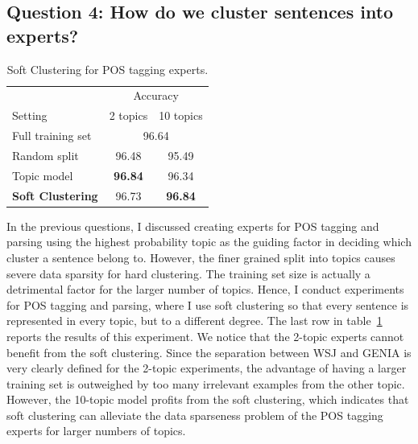 \subsection*{Question 4: How do we cluster sentences into experts? }

\begin{table}[t]
\centering
\begin{tabular}{l|cc}
 & \multicolumn{2}{c}{Accuracy} \\
Setting & \multicolumn{1}{r}{2 topics} & \multicolumn{1}{r}{10 topics} \\ \hline
Full training set & \multicolumn{2}{c}{96.64} \\
Random split & 96.48 & 95.49 \\
Topic model & \textbf{96.84} & 96.34 \\ 
\textbf{Soft Clustering} & 96.73 & \textbf{96.84} \\ \hline
\end{tabular}
\caption{Soft Clustering for POS tagging experts.\label{tab:poswsoftcluster}}
\end{table}

In the previous questions, I discussed creating experts for POS tagging and parsing using the highest probability topic as the guiding factor in deciding which cluster a sentence belong to. However, the finer grained split into topics causes severe data sparsity for hard clustering. The training set size is actually a detrimental factor for the larger number of topics. Hence, I conduct experiments for POS tagging and parsing, where I use soft clustering so that every sentence is represented in every topic, but to a different degree. The last row in table~\ref{tab:poswsoftcluster} reports the results of this experiment. We notice that the 2-topic experts cannot benefit from the soft clustering. Since the separation between WSJ and GENIA is very clearly defined for the 2-topic experiments,  the advantage of having a larger training set is outweighed by too many irrelevant examples from the other topic. However, the 10-topic model profits from the soft clustering, which indicates that soft clustering can alleviate the data sparseness problem of the POS tagging experts for larger numbers of topics. 

